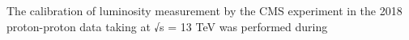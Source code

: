 The calibration of luminosity measurement by the CMS experiment in the 2018 proton-proton data taking at √s = 13 TeV was performed during


